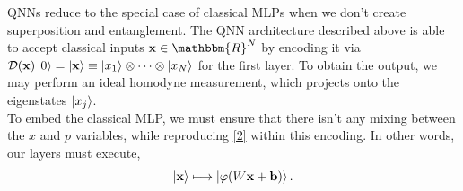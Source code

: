 \documentclass[11pt,oneside]{article}
\theoremstyle{definition}
\theoremstyle{definition}
\newcommand{\R}{\mathbbm{R}}
\newcommand{\D}{\mathcal{D}}
\begin{document}
QNNs reduce to the special case of classical MLPs when we don't create superposition and entanglement. The QNN architecture described above is able to accept classical inputs $\vb{x} \in \R^N$ by encoding it via $\D(\vb{x})\ket{0} = \ket{\vb{x}} \equiv \ket{x_1} \otimes \dots \otimes \ket{x_N}$ for the first layer. To obtain the output, we may perform an ideal homodyne measurement, which projects onto the eigenstates $\ket{x_j}$. \\

To embed the classical MLP, we must ensure that there isn't any mixing between the $x$ and $p$ variables, while reproducing \eqref{2} within this encoding. In other words, our layers must execute,
\begin{equation}
    \ket{\vb{x}} \longmapsto \ket{\varphi(W\vb{x} + \vb{b})}.
\end{equation}
\end{document}
